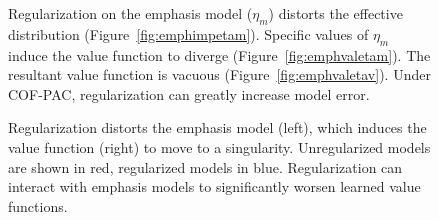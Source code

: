\begin{figure}
	\centering
	
	\label{fig:emphasisplotseta}
	\caption{Regularization on the emphasis model ($\eta_m$) distorts the effective distribution (Figure~\ref{fig:emphimpetam}). Specific values of $\eta_m$ induce the value function to diverge (Figure~\ref{fig:emphvaletam}). The resultant value function is vacuous (Figure~\ref{fig:emphvaletav}). Under COF-PAC, regularization can greatly increase model error. }
\end{figure}

\begin{figure}
	
	\caption{Regularization distorts the emphasis model (left), which induces the value function (right) to move to a singularity. Unregularized models are shown in red, regularized models in blue. Regularization can interact with emphasis models to significantly worsen learned value functions. }\label{fig:emphasisplots}
\end{figure}


